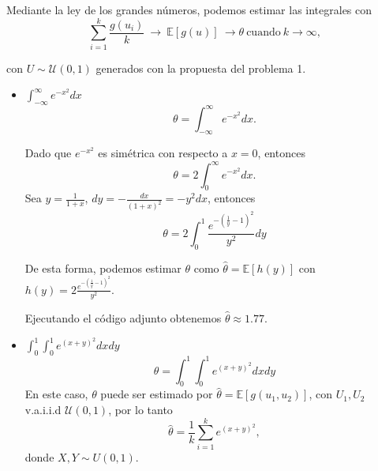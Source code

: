 \documentclass[12pt]{article}
\begin{document}
\begin{enumerate}
        Mediante la ley de los grandes números, podemos estimar las integrales con
        \begin{equation}
            \sum_{i=1}^k\frac{g(u_i)}{k} ~ \to ~ \mathbb{E}[g(u)] ~ \to \theta ~ \text{cuando} ~ k \to \infty,
        \end{equation}

        con $U \sim \mathcal{U}(0,1)$ generados con la propuesta del problema 1.

        \begin{itemize}
          \item $\displaystyle \int_{-\infty}^{\infty}e^{-x^2}dx$
            \begin{equation}
                \theta  = \int_{-\infty}^{\infty}e^{-x^2}dx.
            \end{equation}
            
            Dado que $e^{-x^2}$ es simétrica con respecto a $x=0$, entonces
            \begin{equation}
                \theta  = 2\int_{0}^{\infty}e^{-x^2}dx.
            \end{equation}
            Sea $y = \frac{1}{1+x}$, $dy = -\frac{dx}{(1+x)^2}= -y^2dx$, entonces
            \begin{equation}
                \theta = 2\int_{0}^{1}\frac{e^{-(\frac1y-1)^2}}{y^2}dy
            \end{equation}
            
            De esta forma, podemos estimar $\theta$ como $\hat{\theta} = \mathbb{E}[h(y)]$
            con $ h(y) = 2\frac{e^{-(\frac1y-1)^2}}{y^2}$.
            
            Ejecutando el código adjunto obtenemos $\hat{\theta} \approx 1.77$. \bigskip                        
              
          \item $\displaystyle \int_{0}^{1}\int_{0}^{1}e^{(x+y)^2}dxdy$
            \begin{equation}
                \theta = \int_{0}^{1}\int_{0}^{1}e^{(x+y)^2}dxdy
            \end{equation}
            En este caso, $\theta$ puede ser estimado por $\hat{\theta} = \mathbb{E}[g(u_1, u_2)]$,
            con $U_1, U_2$ v.a.i.i.d $\mathcal{U}(0,1)$, por lo tanto
            \begin{equation}
                \hat{\theta} = \frac1k \sum_{i=1}^ke^{(x+y)^2},
            \end{equation}
            donde $X, Y \sim U(0,1)$.
            

\end{itemize}
\end{enumerate}
\end{document}
